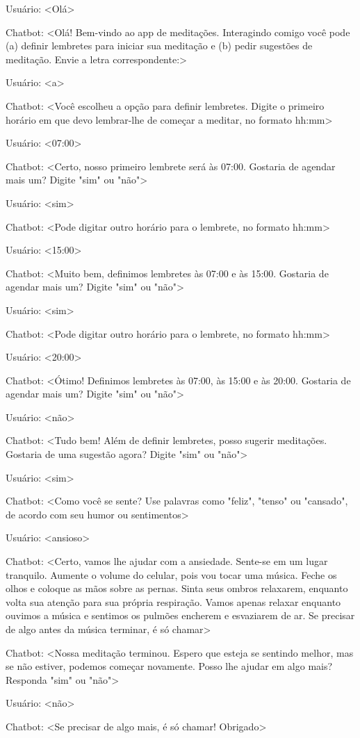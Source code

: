 Usuário: <Olá>

Chatbot: <Olá! Bem-vindo ao app de meditações. Interagindo comigo você pode (a) definir lembretes para iniciar sua meditação e (b) pedir sugestões de meditação. Envie a letra correspondente:>

Usuário: <a>

Chatbot: <Você escolheu a opção para definir lembretes. Digite o primeiro horário em que devo lembrar-lhe de começar a meditar, no formato hh:mm>

Usuário: <07:00>

Chatbot: <Certo, nosso primeiro lembrete será às 07:00. Gostaria de agendar mais um? Digite "sim" ou "não">

Usuário: <sim>

Chatbot: <Pode digitar outro horário para o lembrete, no formato hh:mm>

Usuário: <15:00>

Chatbot: <Muito bem, definimos lembretes às 07:00 e às 15:00. Gostaria de agendar mais um? Digite "sim" ou "não">

Usuário: <sim>

Chatbot: <Pode digitar outro horário para o lembrete, no formato hh:mm>

Usuário: <20:00>

Chatbot: <Ótimo! Definimos lembretes às 07:00, às 15:00 e às 20:00. Gostaria de agendar mais um? Digite "sim" ou "não">

Usuário: <não>

Chatbot: <Tudo bem! Além de definir lembretes, posso sugerir meditações. Gostaria de uma sugestão agora? Digite "sim" ou "não">

Usuário: <sim>

Chatbot: <Como você se sente? Use palavras como "feliz", "tenso" ou "cansado", de acordo com seu humor ou sentimentos>

Usuário: <ansioso>

Chatbot: <Certo, vamos lhe ajudar com a ansiedade. Sente-se em um lugar tranquilo. Aumente o volume do celular, pois vou tocar uma música. Feche os olhos e coloque as mãos sobre as pernas. Sinta seus ombros relaxarem, enquanto volta sua atenção para sua própria respiração. Vamos apenas relaxar enquanto ouvimos a música e sentimos os pulmões encherem e esvaziarem de ar. Se precisar de algo antes da música terminar, é só chamar>

Chatbot: <Nossa meditação terminou. Espero que esteja se sentindo melhor, mas se não estiver, podemos começar novamente. Posso lhe ajudar em algo mais? Responda "sim" ou "não">

Usuário: <não>

Chatbot: <Se precisar de algo mais, é só chamar! Obrigado>